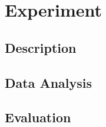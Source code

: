 \documentclass[]{article}
\begin{document}
\section{Experiment}
\subsection{Description}
\subsection{Data Analysis}
\subsection{Evaluation}
\end{document}
